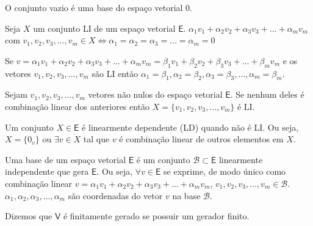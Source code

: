 \documentclass[10pt,a4paper]{article}
\begin{document}
\begin{definition}
	O conjunto vazio é uma base do espaço vetorial ${0}$.
\end{definition}

\begin{theorem}
	Seja $X$ um conjunto LI de um espaço vetorial $\textsf{E}$. $\alpha_1 v_1 + \alpha_2 v_2 + \alpha_3 v_3 + \dots + \alpha_m v_m$ com $v_1, v_2, v_3, \dots, v_m \in X \Leftrightarrow \alpha_1 = \alpha_2 = \alpha_3 = \dots = \alpha_m = 0$
\end{theorem}

\begin{corollary}
	Se $v = \alpha_1 v_1 + \alpha_2 v_2 + \alpha_3 v_3 + \dots + \alpha_m v_m = \beta_1 v_1 + \beta_2 v_2 + \beta_3 v_3 + \dots + \beta_m v_m$ e os vetores $v_1, v_2, v_3, \dots, v_m $ são LI então $\alpha_1 = \beta_1, \alpha_2 = \beta_2, \alpha_3 = \beta_3, \dots, \alpha_m = \beta_m$.
\end{corollary}

\begin{theorem}
	Sejam $v_1, v_2, v_3, \dots, v_m $ vetores não nulos do espaço vetorial $\textsf{E}$. Se nenhum deles é combinação linear dos anteriores então $X = \{v_1, v_2, v_3, \dots, v_m \}$ é LI.
\end{theorem}

\begin{definition}
	Um conjunto $X \in \textsf{E}$ é linearmente dependente (LD) quando não é LI. Ou seja, $X = \{0_v\}$ ou $\exists v \in X$ tal que $v$ é combinação linear de outros elementos em $X$.
\end{definition}

\begin{definition}
	Uma base de um espaço vetorial $\textsf{E}$ é um conjunto $\mathcal{B} \subset \textsf{E}$ linearmente independente que gera $\textsf{E}$. Ou seja, $\forall v \in \textsf{E}$ se exprime, de modo único como combinação linear $v = \alpha_1 v_1 + \alpha_2 v_2 + \alpha_3 v_3 + \dots + \alpha_m v_m$, $v_1, v_2, v_3,\dots, v_m \in \mathcal{B}$. $\alpha_1, \alpha_2, \alpha_3, \dots, \alpha_m$ são coordenadas do vetor $v$ na base $\mathcal{B}$.
\end{definition}

\begin{definition}
	Dizemos que $\mathsf{V}$ é finitamente gerado se possuir um gerador finito.
\end{definition}
\end{document}
